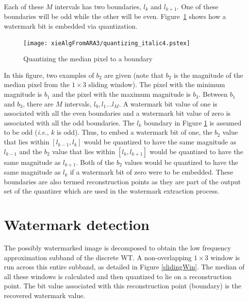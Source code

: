 \documentclass[12pt]{report}
\begin{document}
Each of these $M$ intervals has two boundaries, $l_{k}$ and $l_{k+1}$. One of these boundaries will be odd
while the other will be even. Figure~\ref{fig-quantizing} shows how a watermark bit is embedded via quantization.
\begin{figure}[hbt]
        \begin{center} 
                \texttt{[image: xieAlgFromARA3/quantizing\_italic4.pstex]} 
		\caption{Quantizing the median pixel to a boundary}
		\label{fig-quantizing}
	\end{center}
\end{figure}  
In this figure, two examples of $b_{2}$ are given (note that $b_{2}$ is the magnitude of the median pixel from 
the $1 \times 3$ sliding window). The pixel with the minimum magnitude is $b_{1}$ and the pixel with the 
maximum magnitude is $b_{3}$. Between $b_{1}$ and $b_{3}$, there are $M$ intervals, $l_{0}, l_{1} ... l_{M}$.
A watermark bit value of one is associated with all the even boundaries and a watermark bit value of zero 
is associated with all the odd boundaries. The $l_{k}$ boundary in Figure \ref{fig-quantizing} is assumed to be odd
(\emph{i.e.}, $k$ is odd).
Thus, to embed a watermark bit of one, the $b_{2}$ value that lies within $[l_{k-1},l_{k}]$ would
be quantized to have the same magnitude as $l_{k-1}$ and the $b_{2}$ value that lies within $[l_{k},l_{k+1}]$
would be quantized to have the same magnitude as $l_{k+1}$. Both of the $b_{2}$ values would be quantized to 
have the same magnitude as $l_{k}$ if a watermark bit of zero were to be embedded.
These boundaries are also termed reconstruction points as they are part of the output set of the quantizer 
which are used in the watermark extraction process.

\section{Watermark detection}
The possibly watermarked image is decomposed to obtain the low frequency approximation subband of the discrete WT.
A non-overlapping $1 \times 3$ window is run across this entire subband, as detailed in Figure \ref{slidingWin}.
The median of all these windows is calculated and then quantized to lie on a reconstruction point. 
The bit value associated with this reconstruction point (boundary) is the recovered watermark value.





			
\end{document}
